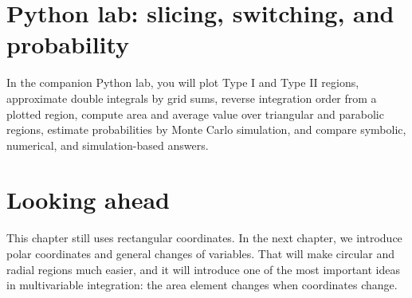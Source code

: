 \documentclass[11pt]{article}
\begin{document}
\section{Python lab: slicing, switching, and probability}

In the companion Python lab, you will plot Type I and Type II regions, approximate double integrals by grid sums, reverse integration order from a plotted region, compute area and average value over triangular and parabolic regions, estimate probabilities by Monte Carlo simulation, and compare symbolic, numerical, and simulation-based answers.

\section{Looking ahead}

This chapter still uses rectangular coordinates. In the next chapter, we introduce polar coordinates and general changes of variables. That will make circular and radial regions much easier, and it will introduce one of the most important ideas in multivariable integration: the area element changes when coordinates change.
\end{document}
